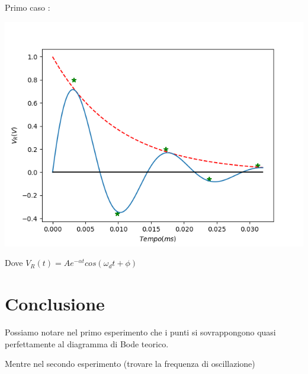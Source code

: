     \hspace{0.5 cm}
    \begin{minipage}{.4\linewidth}
        \hspace{0.5 cm}
        Primo caso : \par
        \includegraphics[width = 9 cm]{secondoese.png}
        \par
        \hspace{0.5 cm} Dove \color{blue} $V_R(t) = Ae^{-\alpha t} cos(\omega_d t + \phi)$
    \end{minipage}

    \section{Conclusione}
    Possiamo notare nel primo esperimento che i punti si sovrappongono quasi perfettamente al diagramma di Bode teorico.\par
    Mentre nel secondo esperimento (trovare la frequenza di oscillazione)
